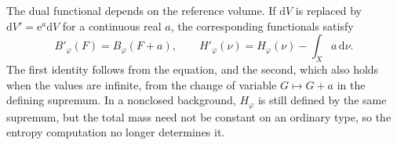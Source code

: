The dual functional depends on the reference volume. If $\mathrm{d}V$ is replaced by $\mathrm{d}V'=\mathrm{e}^a \mathrm{d}V$ for a continuous real $a$, the corresponding functionals satisfy
\[
 B'_\varphi(F)=B_\varphi(F+a),\qquad
 H'_\varphi(\nu)=H_\varphi(\nu)-\int_Xa\,\mathrm{d}\nu.
\]
The first identity follows from the equation, and the second, which also holds when the values are infinite, from the change of variable $G\mapsto G+a$ in the defining supremum. In a nonclosed background, $H_\varphi$ is still defined by the same supremum, but the total mass need not be constant on an ordinary type, so the entropy computation no longer determines it.


